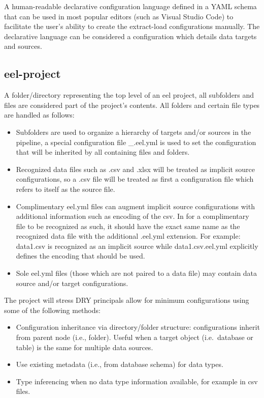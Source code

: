 A human-readable declarative configuration language defined in a YAML
schema that can be used in most popular editors (such as Visual Studio
Code) to facilitate the user's ability to create the extract-load
configurations manually. The declarative language can be considered a
configuration which details data targets and sources.

\subsection{eel-project}\label{eel-project}

A folder/directory representing the top level of an eel project, all
subfolders and files are considered part of the project's contents. All
folders and certain file types are handled as follows:

\begin{itemize}
\item
  Subfolders are used to organize a hierarchy of targets and/or sources
  in the pipeline, a special configuration file \_.eel.yml is used to
  set the configuration that will be inherited by all containing files
  and folders.
\item
  Recognized data files such as .csv and .xlsx will be treated as
  implicit source configurations, so a .csv file will be treated as
  first a configuration file which refers to itself as the source file.
\item
  Complimentary eel.yml files can augment implicit source configurations
  with additional information such as encoding of the csv. In for a
  complimentary file to be recognized as such, it should have the exact
  same name as the recognized data file with the additional .eel.yml
  extension. For example: data1.csv is recognized as an implicit source
  while data1.csv.eel.yml explicitly defines the encoding that should be
  used.
\item
  Sole eel.yml files (those which are not paired to a data file) may
  contain data source and/or target configurations.
\end{itemize}

The project will stress DRY principals allow for minimum configurations
using some of the following methods:

\begin{itemize}
\item
  Configuration inheritance via directory/folder structure:
  configurations inherit from parent node (i.e., folder). Useful when a
  target object (i.e.~database or table) is the same for multiple data
  sources.
\item
  Use existing metadata (i.e., from database schema) for data types.
\item
  Type inferencing when no data type information available, for example
  in csv files.
\end{itemize}

